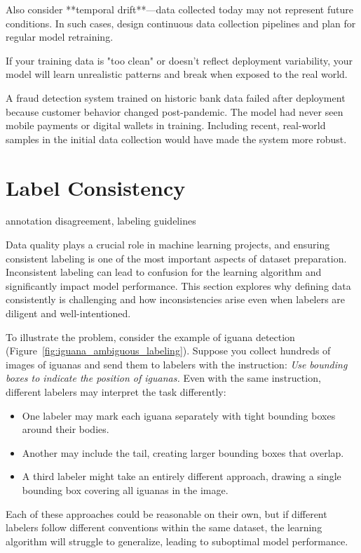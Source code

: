 \documentclass[12pt,openany, draft]{book}
\begin{document}
Also consider **temporal drift**—data collected today may not represent future conditions. In such cases, design continuous data collection pipelines and plan for regular model retraining.

If your training data is "too clean" or doesn't reflect deployment variability, your model will learn unrealistic patterns and break when exposed to the real world.

\begin{examplebox}
A fraud detection system trained on historic bank data failed after deployment because customer behavior changed post-pandemic. The model had never seen mobile payments or digital wallets in training. Including recent, real-world samples in the initial data collection would have made the system more robust.
\end{examplebox}



\section{Label Consistency}

\begin{keywordsbox}
annotation disagreement, labeling guidelines
\end{keywordsbox}

Data quality plays a crucial role in machine learning projects, and ensuring consistent labeling is one of the most important aspects of dataset preparation. Inconsistent labeling can lead to confusion for the learning algorithm and significantly impact model performance. This section explores why defining data consistently is challenging and how inconsistencies arise even when labelers are diligent and well-intentioned. \newline

To illustrate the problem, consider the example of iguana detection (Figure~\ref{fig:iguana_ambiguous_labeling}). Suppose you collect hundreds of images of iguanas and send them to labelers with the instruction: \textit{Use bounding boxes to indicate the position of iguanas.} Even with the same instruction, different labelers may interpret the task differently:
\begin{itemize}
    \item One labeler may mark each iguana separately with tight bounding boxes around their bodies.
    \item Another may include the tail, creating larger bounding boxes that overlap.
    \item A third labeler might take an entirely different approach, drawing a single bounding box covering all iguanas in the image.
\end{itemize}
Each of these approaches could be reasonable on their own, but if different labelers follow different conventions within the same dataset, the learning algorithm will struggle to generalize, leading to suboptimal model performance.
\end{document}
